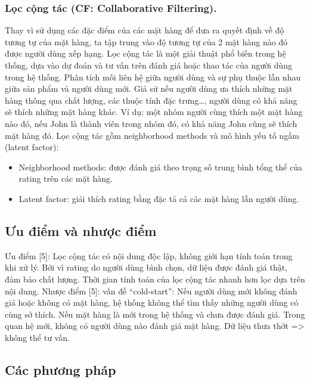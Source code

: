 \documentclass[a4paper,12pt,numbered,print,index,custombib, oneside, custommargin]{report}
\begin{document}
\subsubsection{Lọc cộng tác (CF: Collaborative Filtering).}
Thay vì sử dụng các đặc điểm của các mặt hàng để đưa ra quyết định về độ tương tự của mặt hàng, ta tập trung vào độ tương tự của 2 mặt hàng nào đó được người dùng xếp hạng. 
Lọc cộng tác là một giải thuật phổ biến trong hệ thống, dựa vào dự đoán và tư vấn trên đánh giá hoặc thao tác của người dùng trong hệ thống. Phân tích mối liên hệ giữa người dùng và sự phụ thuộc lẫn nhau giữa sản phẩm và người dùng mới.
Giả sử nếu người dùng ưa thích những mặt hàng thông qua chất lượng, các thuộc tính đặc trưng…, người dùng có khả năng sẽ thích những mặt hàng khác. Ví dụ: một nhóm người cùng thích một mặt hàng nào đó, nếu John là thành viên trong nhóm đó, có khả năng John cũng sẽ thích mặt hàng đó.
Lọc cộng tác gồm neighborhood methods và mô hình yếu tố ngầm (latent factor):
\begin{itemize}
\item Neighborhood methods: được đánh giá theo trọng số trung bình tổng thể của rating trên các mặt hàng.
\item Latent factor: giải thích rating bằng đặc tả cả các mặt hàng lẫn người dùng.
\end{itemize}

\subsection{Ưu điểm và nhược điểm}
Ưu điểm [5]:   Lọc cộng tác có nội dung độc lập, không giới hạn tính toán trong khi xử lý. Bởi vì rating do người dùng bình chọn, dữ liệu được đánh giá thật, đảm bảo chất lượng. Thời gian tính toán của lọc cộng tác nhanh hơn lọc dựa trên nội dung.
Nhược điểm [5]:  vấn đề “cold-start”:  Nếu người dùng mới không đánh giá hoặc không có mặt hàng, hệ thống không thể tìm thấy những người dùng có cùng sở thích. Nếu mặt hàng là mới trong hệ thống và chưa được đánh giá. Trong quan hệ mới, không có người dùng nào đánh giá mặt hàng. Dữ liệu thưa thớt => không thể tư vấn.	

\subsection{Các phương pháp}
\end{document}
